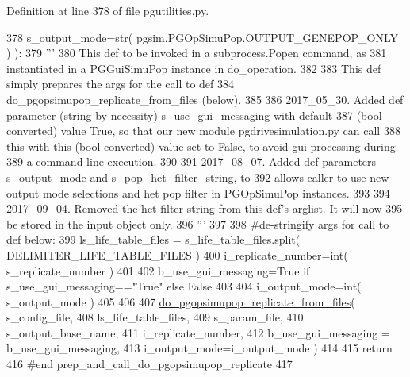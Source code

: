 Definition at line 378 of file pgutilities.\+py.


\begin{DoxyCode}
378                                             s\_output\_mode=str( pgsim.PGOpSimuPop.OUTPUT\_GENEPOP\_ONLY ) ):
379     \textcolor{stringliteral}{''' }
380 \textcolor{stringliteral}{    This def to be invoked in a subprocess.Popen command, as}
381 \textcolor{stringliteral}{    instantiated in a PGGuiSimuPop instance in do\_operation.}
382 \textcolor{stringliteral}{}
383 \textcolor{stringliteral}{    This def simply prepares the args for the call to def}
384 \textcolor{stringliteral}{    do\_pgopsimupop\_replicate\_from\_files (below).}
385 \textcolor{stringliteral}{}
386 \textcolor{stringliteral}{    2017\_05\_30.  Added def parameter (string by necessity) s\_use\_gui\_messaging with default}
387 \textcolor{stringliteral}{    (bool-converted) value True, so that our new module pgdrivesimulation.py can call}
388 \textcolor{stringliteral}{    this with this (bool-converted) value set to False, to avoid gui processing during}
389 \textcolor{stringliteral}{    a command line execution.}
390 \textcolor{stringliteral}{}
391 \textcolor{stringliteral}{    2017\_08\_07.  Added def parameters s\_output\_mode and s\_pop\_het\_filter\_string, to}
392 \textcolor{stringliteral}{    allows caller to use new output mode selections and het pop filter in PGOpSimuPop instances.}
393 \textcolor{stringliteral}{}
394 \textcolor{stringliteral}{    2017\_09\_04. Removed the het filter string from this def's arglist.  It will now}
395 \textcolor{stringliteral}{    be stored in the input object only.}
396 \textcolor{stringliteral}{    '''}
397 
398     \textcolor{comment}{#de-stringify args for call to def below:}
399     ls\_life\_table\_files = s\_life\_table\_files.split( DELIMITER\_LIFE\_TABLE\_FILES )
400     i\_replicate\_number=int( s\_replicate\_number )
401 
402     b\_use\_gui\_messaging=\textcolor{keyword}{True} \textcolor{keywordflow}{if} s\_use\_gui\_messaging==\textcolor{stringliteral}{"True"} \textcolor{keywordflow}{else} \textcolor{keyword}{False}
403 
404     i\_output\_mode=int( s\_output\_mode )
405 
406 
407     \hyperlink{namespacenegui_1_1pgutilities_aa80fcb5144db7e03186d7496ab1de393}{do\_pgopsimupop\_replicate\_from\_files}( s\_config\_file,
408                         ls\_life\_table\_files,
409                         s\_param\_file,
410                         s\_output\_base\_name,
411                         i\_replicate\_number,
412                         b\_use\_gui\_messaging =  b\_use\_gui\_messaging,
413                         i\_output\_mode=i\_output\_mode )
414 
415     \textcolor{keywordflow}{return}
416 \textcolor{comment}{#end prep\_and\_call\_do\_pgopsimupop\_replicate}
417 
\end{DoxyCode}

